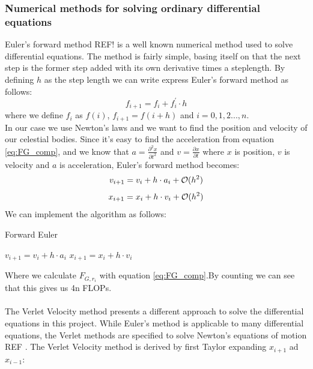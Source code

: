 \documentclass{article}
\newcommand{\husk}[1]{\color{red} #1 \color{black}}
\begin{document}
\subsubsection{Numerical methods for solving ordinary differential equations}
Euler's forward method \husk{REF!} is a well known numerical method used to solve differential equations. The method is fairly simple, basing itself on that the next step is the former step added with its own derivative times a steplength. By defining $h$ as the step length we can write express Euler's forward method as follows:
\begin{equation}
f_{i + 1} = f_i + f^{'}_i \cdot h
\label{eq:fwdEuler}
\end{equation}
where we define $f_i$ as $f(i)$, $f_{i+1} = f(i + h)$ and $i = 0, 1, 2 ... , n$. \\
In our case we use Newton's laws and we want to find the position and velocity of our celestial bodies. Since it's easy to find the acceleration from equation \eqref{eq:FG_comp}, and we know that $a = \frac{\partial^2 x}{\partial t^2}$ and $v = \frac{\partial x}{\partial t}$ where $x$ is position, $v$ is velocity and $a$ is acceleration, Euler's forward method becomes:
\begin{equation}
v_{i + 1} = v_i + h \cdot a_i + \mathcal{O}(h^2)\\
\label{eq:Eulervel}
\end{equation}
\begin{equation}
x_{i + 1} = x_i + h \cdot v_i + \mathcal{O}(h^2)\\
\label{eq:Eulerpos}
\end{equation}
We can implement the algorithm as follows:
\begin{algorithm}[H]
\small
\caption{Forward Euler}\label{alg:VelVerlet}
\begin{algorithmic}[1]
\State $v_{i+1} = v_i + h\cdot a_i $
\State $x_{i+1} = x_i + h\cdot v_i $
\EndFor
\end{algorithmic}
\end{algorithm}
Where we calculate $F_{G, r_i}$ with equation \eqref{eq:FG_comp}.By counting we can see that this gives us 4n FLOPs. \\ \\
The Verlet Velocity method presents a different approach to solve the differential equations in this project. While Euler's method is applicable to many differential equations, the Verlet methods are specified to solve Newton's equations of motion \husk{REF}. The Verlet Velocity method is derived by first Taylor expanding $x_{i + 1}$ ad $x_{i-1}$:
\end{document}
